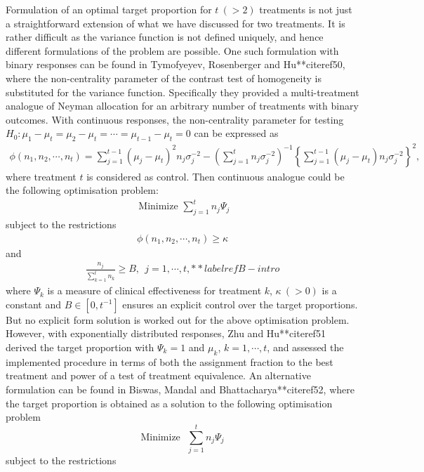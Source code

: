 Formulation of an optimal target proportion for $t~(>2)$ treatments is not just a straightforward extension of what we have discussed for two treatments. It is rather difficult as the variance function is not defined uniquely, and hence different formulations of the problem are possible. One such formulation with binary responses can be found in Tymofyeyev, Rosenberger and Hu**citeref{50}, where the non-centrality parameter of the contrast test of homogeneity is substituted for the variance function. Specifically they provided a multi-treatment analogue of Neyman allocation for an arbitrary number of treatments with binary outcomes. With continuous responses, the non-centrality parameter for testing $H_{0}: \mu_{1}-\mu_{t}=\mu_{2}-\mu_{t}=\cdots =\mu_{t-1}-\mu_{t}=0$  can be expressed as
\begin{eqnarray*}
\phi(n_{1},n_{2},\cdots ,n_{t})=\sum_{j=1}^{t-1}(\mu_{j}-\mu_{t})^{2}n_{j}\sigma_{j}^{-2}-\left(\sum_{j=1}^{t}n_{j}\sigma_{j}^{-2}\right)^{-1}\left\{\sum_{j=1}^{t-1}(\mu_{j}-\mu_{t})n_{j}\sigma_{j}^{-2}\right\}^{2},
\end{eqnarray*}
where treatment $t$ is considered as control. Then continuous analogue  could be the following optimisation problem:
\begin{eqnarray*}
\mbox{~Minimize~} \sum_{j=1}^{t}n_{j}\Psi_{j}
\end{eqnarray*}
subject to the restrictions
\begin{eqnarray*}
\phi(n_{1},n_{2},\cdots ,n_{t})\geq \kappa
\end{eqnarray*}
and
\begin{eqnarray}
\frac{n_{j}}{\sum_{k=1}^{t}n_{k}}\geq B,~~ j=1,\cdots ,t,**labelref{B-intro}
\end{eqnarray}
where $\Psi_{k}$ is a measure of clinical effectiveness for treatment $k$, $\kappa~(>0)$ is a constant and $B\in[0,t^{-1}]$ ensures an explicit control over the target proportions. But no explicit form solution is worked out for the above optimisation problem. However, with exponentially distributed responses, Zhu and Hu**citeref{51} derived the target proportion with $\Psi_{k}=1$ and $\mu_{k}$, $k=1,\cdots ,t$, and assessed the implemented procedure in terms of both the assignment fraction to the best treatment and power of a test of treatment equivalence. An alternative formulation can be found in Biswas, Mandal and Bhattacharya**citeref{52}, where the target proportion is obtained as a solution to the  following optimisation problem
$$\mbox{Minimize~ } \sum_{j=1}^{t}n_{j}\Psi_{j}$$
subject to the restrictions
